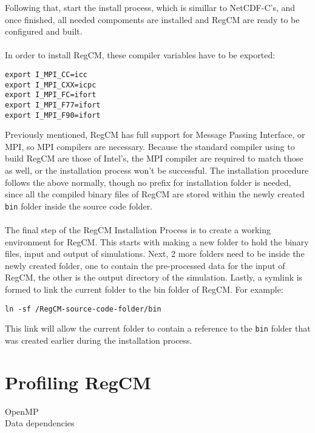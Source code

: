 Following that, start the install process, which is simillar to NetCDF-C's, and once finished, all needed compoments are installed and RegCM are ready to be configured and built. \\
~\\
In order to install RegCM, these compiler variables have to be exported:
\begin{center}
\begin{BVerbatim}
export I_MPI_CC=icc
export I_MPI_CXX=icpc
export I_MPI_FC=ifort
export I_MPI_F77=ifort
export I_MPI_F90=ifort
\end{BVerbatim}
\end{center}
Previously mentioned, RegCM has full support for Message Passing Interface, or MPI, so MPI compilers are necessary. Because the standard compiler using to build RegCM are those of Intel's, the MPI compiler are required to match those as well, or the installation process won't be successful. The installation procedure follows the above normally, though no prefix for installation folder is needed, since all the compiled binary files of RegCM are stored within the newly created \verb|bin| folder inside the source code folder. \\
~\\
The final step of the RegCM Installation Process is to create a working environment for RegCM. This starts with making a new folder to hold the binary files, input and output of simulations. Next, 2 more folders need to be inside the newly created folder, one to contain the pre-processed data for the input of RegCM, the other is the output directory of the simulation. Lastly, a symlink is formed to link the current folder to the bin folder of RegCM. For example:
\begin{center}
\begin{BVerbatim}
ln -sf /RegCM-source-code-folder/bin
\end{BVerbatim}
\end{center}
This link will allow the current folder to contain a reference to the \verb|bin| folder that was created earlier during the installation process. \\

\section{Profiling RegCM}
OpenMP\\
Data dependencies\\
